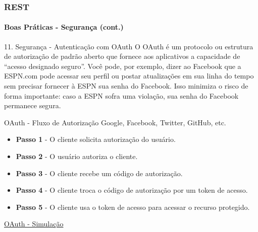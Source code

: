 \documentclass[
	9pt, %
	t, %
]{beamer}
\newcommand{\iconLink}[2]{\href{#1}{\faLink \hspace{0.2em} {#2}}}
\begin{document}
\begin{frame}
	\frametitle{REST}
	\framesubtitle{Boas Práticas - Segurança (cont.)}
	
	\begin{block}{11. Segurança - Autenticação com OAuth}
		O OAuth é um protocolo ou estrutura de autorização de padrão aberto que fornece aos aplicativos a capacidade de “acesso designado seguro”. Você pode, por exemplo, dizer ao Facebook que a ESPN.com pode acessar seu perfil ou postar atualizações em sua linha do tempo sem precisar fornecer à ESPN sua senha do Facebook. Isso minimiza o risco de forma importante: caso a ESPN sofra uma violação, sua senha do Facebook permanece segura.
	\end{block}

	\begin{exampleblock}{OAuth - Fluxo de Autorização}
		Google, Facebook, Twitter, GitHub, etc.
		\begin{itemize}
			\item \textbf{Passo 1} - O cliente solicita autorização do usuário.
			\item \textbf{Passo 2} - O usuário autoriza o cliente.
			\item \textbf{Passo 3} - O cliente recebe um código de autorização.
			\item \textbf{Passo 4} - O cliente troca o código de autorização por um token de acesso.
			\item \textbf{Passo 5} - O cliente usa o token de acesso para acessar o recurso protegido.
		\end{itemize}
		\smallskip
		{\small \iconLink{https://blog.miguelgrinberg.com/static/images/flask-oauth2-demo.gif}{OAuth - Simulação}}
	\end{exampleblock}


\end{frame}
\end{document}
